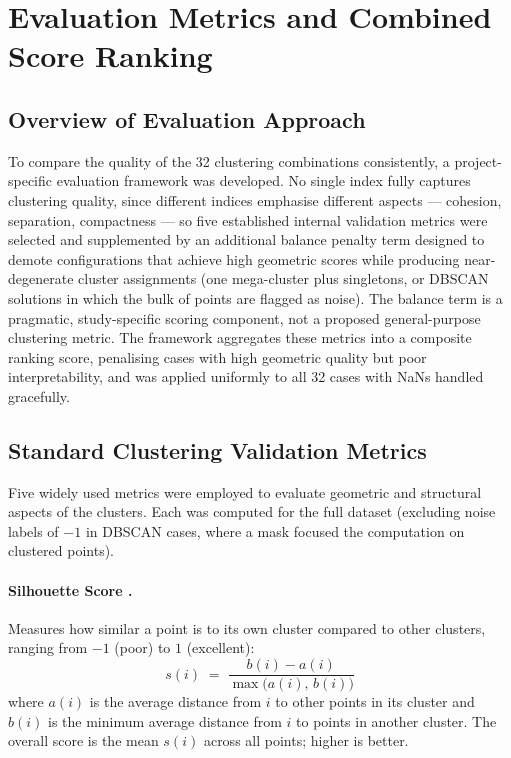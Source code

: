 \section{Evaluation Metrics and Combined Score Ranking}\label{sec:evaluation_metrics_combined}

\subsection{Overview of Evaluation Approach}

To compare the quality of the 32 clustering combinations consistently, a project-specific evaluation framework was developed. No single index fully captures clustering quality, since different indices emphasise different aspects --- cohesion, separation, compactness --- so five established internal validation metrics were selected and supplemented by an additional balance penalty term designed to demote configurations that achieve high geometric scores while producing near-degenerate cluster assignments (one mega-cluster plus singletons, or DBSCAN solutions in which the bulk of points are flagged as noise). The balance term is a pragmatic, study-specific scoring component, not a proposed general-purpose clustering metric. The framework aggregates these metrics into a composite ranking score, penalising cases with high geometric quality but poor interpretability, and was applied uniformly to all 32 cases with NaNs handled gracefully.

\subsection{Standard Clustering Validation Metrics}

Five widely used metrics were employed to evaluate geometric and structural aspects of the clusters. Each was computed for the full dataset (excluding noise labels of $-1$ in DBSCAN cases, where a mask focused the computation on clustered points).

\paragraph{Silhouette Score \cite{ref17}.} Measures how similar a point is to its own cluster compared to other clusters, ranging from $-1$ (poor) to $1$ (excellent):
\begin{equation}\label{eq:silhouette}
s(i) \;=\; \frac{b(i) - a(i)}{\max\bigl(a(i),\, b(i)\bigr)}
\end{equation}
where $a(i)$ is the average distance from $i$ to other points in its cluster and $b(i)$ is the minimum average distance from $i$ to points in another cluster. The overall score is the mean $s(i)$ across all points; higher is better.

